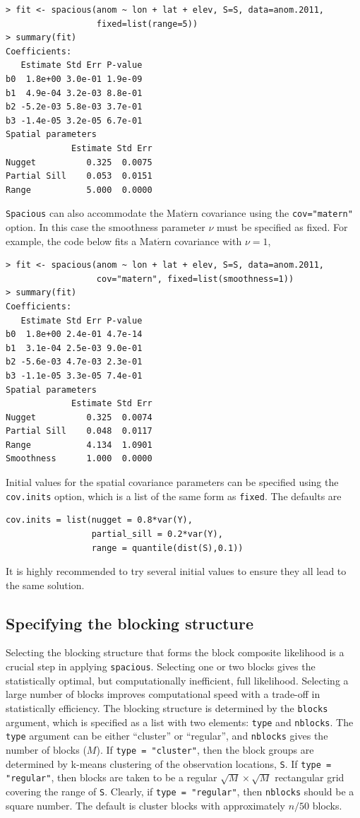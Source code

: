 \documentclass[11pt]{article}
\newcommand{\Matern}{ \mbox{Mat$\acute{\mbox{e}}$rn}}
\begin{document}
\begin{verbatim}
> fit <- spacious(anom ~ lon + lat + elev, S=S, data=anom.2011,
                  fixed=list(range=5))
> summary(fit)
Coefficients:
   Estimate Std Err P-value
b0  1.8e+00 3.0e-01 1.9e-09
b1  4.9e-04 3.2e-03 8.8e-01
b2 -5.2e-03 5.8e-03 3.7e-01
b3 -1.4e-05 3.2e-05 6.7e-01
Spatial parameters
             Estimate Std Err
Nugget          0.325  0.0075
Partial Sill    0.053  0.0151
Range           5.000  0.0000
\end{verbatim}

{\tt Spacious} can also accommodate the $\Matern$ covariance using the {\tt cov="matern"} option.
In this case the smoothness parameter $\nu$ must be specified as fixed.
For example, the code below fits a $\Matern$ covariance with $\nu=1$,

\begin{verbatim}
> fit <- spacious(anom ~ lon + lat + elev, S=S, data=anom.2011,
                  cov="matern", fixed=list(smoothness=1))
> summary(fit)
Coefficients:
   Estimate Std Err P-value
b0  1.8e+00 2.4e-01 4.7e-14
b1  3.1e-04 2.5e-03 9.0e-01
b2 -5.6e-03 4.7e-03 2.3e-01
b3 -1.1e-05 3.3e-05 7.4e-01
Spatial parameters
             Estimate Std Err
Nugget          0.325  0.0074
Partial Sill    0.048  0.0117
Range           4.134  1.0901
Smoothness      1.000  0.0000
\end{verbatim}

Initial values for the spatial covariance parameters can be specified using the {\tt cov.inits} option, which is a list of the same form as {\tt fixed}.   The defaults are
\begin{verbatim}
cov.inits = list(nugget = 0.8*var(Y),
                 partial_sill = 0.2*var(Y),
                 range = quantile(dist(S),0.1))
\end{verbatim}
It is highly recommended to try several initial values to ensure they all lead to the same solution.

\subsection{Specifying the blocking structure}

Selecting the blocking structure that forms the block composite likelihood is a crucial step in applying {\tt spacious}.
Selecting one or two blocks gives the statistically optimal, but computationally inefficient, full likelihood.
Selecting a large number of blocks improves computational speed with a trade-off in statistically efficiency.
The blocking structure is determined by the {\tt blocks} argument, which is specified as a list with two elements: {\tt type} and {\tt nblocks}.
The {\tt type} argument can be either ``cluster'' or ``regular'', and {\tt nblocks} gives the number of blocks ($M$).
If {\tt type = "cluster"}, then the block groups are determined by k-means clustering of the observation locations, {\tt S}.
If {\tt type = "regular"}, then blocks are taken to be a regular $\sqrt{M}\times\sqrt{M}$ rectangular grid covering the range of {\tt S}.
Clearly, if {\tt type = "regular"}, then {\tt nblocks} should be a square number.
The default is cluster blocks with approximately $n/50$ blocks.
\end{document}
